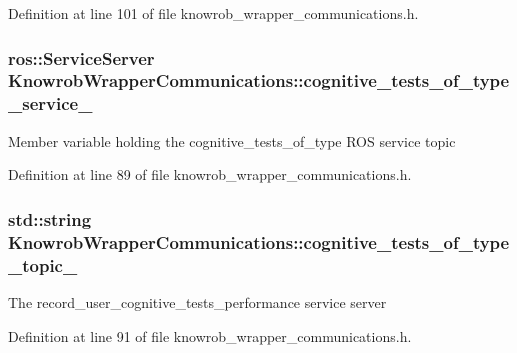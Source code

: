 Definition at line 101 of file knowrob\-\_\-wrapper\-\_\-communications.\-h.

\hypertarget{classKnowrobWrapperCommunications_ac2498f2732057c72fc4bbc0ffcb29c7b}{
\subsubsection[{cognitive\-\_\-tests\-\_\-of\-\_\-type\-\_\-service\-\_\-}]{\setlength{\rightskip}{0pt plus 5cm}ros\-::\-Service\-Server Knowrob\-Wrapper\-Communications\-::cognitive\-\_\-tests\-\_\-of\-\_\-type\-\_\-service\-\_\-\hspace{0.3cm}{\ttfamily [private]}}}\label{classKnowrobWrapperCommunications_ac2498f2732057c72fc4bbc0ffcb29c7b}
Member variable holding the cognitive\-\_\-tests\-\_\-of\-\_\-type R\-O\-S service topic 

Definition at line 89 of file knowrob\-\_\-wrapper\-\_\-communications.\-h.

\hypertarget{classKnowrobWrapperCommunications_a40ffe00f1d833232faf6d265bd5276b8}{
\subsubsection[{cognitive\-\_\-tests\-\_\-of\-\_\-type\-\_\-topic\-\_\-}]{\setlength{\rightskip}{0pt plus 5cm}std\-::string Knowrob\-Wrapper\-Communications\-::cognitive\-\_\-tests\-\_\-of\-\_\-type\-\_\-topic\-\_\-\hspace{0.3cm}{\ttfamily [private]}}}\label{classKnowrobWrapperCommunications_a40ffe00f1d833232faf6d265bd5276b8}
The record\-\_\-user\-\_\-cognitive\-\_\-tests\-\_\-performance service server 

Definition at line 91 of file knowrob\-\_\-wrapper\-\_\-communications.\-h.

